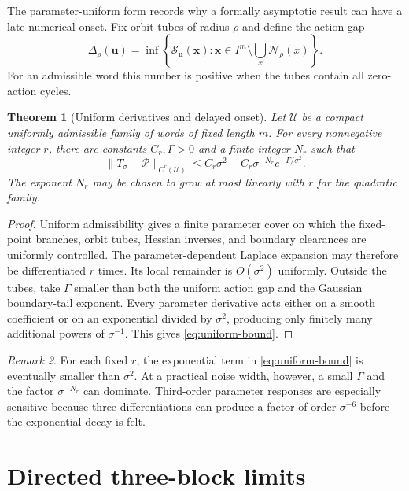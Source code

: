 \documentclass[11pt]{article}
\newtheorem{theorem}{Theorem}[section]
\theoremstyle{remark}
\newtheorem{remark}[theorem]{Remark}
\newcommand{\cP}{\mathcal P}
\newcommand{\cS}{\mathcal S}
\newcommand{\cU}{\mathcal U}
\newcommand{\cN}{\mathcal N}
\newcommand{\bu}{\boldsymbol u}
\newcommand{\bx}{\boldsymbol x}
\begin{document}
The parameter-uniform form records why a formally asymptotic result can have a
late numerical onset.  Fix orbit tubes of radius $\rho$ and define the action
gap
\begin{equation}
 \Delta_\rho(\bu)=
 \inf\left\{\cS_{\bu}(\bx):
 \bx\in I^m\setminus\bigcup_x\cN_\rho(x)\right\}.
 \label{eq:action-gap}
\end{equation}
For an admissible word this number is positive when the tubes contain all
zero-action cycles.

\begin{theorem}[Uniform derivatives and delayed onset]
\label{thm:uniform}
Let $\cU$ be a compact uniformly admissible family of words of fixed length
$m$.  For every nonnegative integer $r$, there are constants
$C_r,\Gamma>0$ and a finite integer $N_r$ such that
\begin{equation}
 \|T_\sigma-\cP\|_{C^r(\cU)}
 \le C_r\sigma^2+C_r\sigma^{-N_r}e^{-\Gamma/\sigma^2}.
 \label{eq:uniform-bound}
\end{equation}
The exponent $N_r$ may be chosen to grow at most linearly with $r$ for the
quadratic family.
\end{theorem}

\begin{proof}
Uniform admissibility gives a finite parameter cover on which the fixed-point
branches, orbit tubes, Hessian inverses, and boundary clearances are uniformly
controlled.  The parameter-dependent Laplace expansion may therefore be
differentiated $r$ times.  Its local remainder is $O(\sigma^2)$ uniformly.
Outside the tubes, take $\Gamma$ smaller than both the uniform action gap and
the Gaussian boundary-tail exponent.  Every parameter derivative acts either
on a smooth coefficient or on an exponential divided by $\sigma^2$, producing
only finitely many additional powers of $\sigma^{-1}$.  This gives
\eqref{eq:uniform-bound}.
\end{proof}

\begin{remark}
For each fixed $r$, the exponential term in \eqref{eq:uniform-bound} is
eventually smaller than $\sigma^2$.  At a practical noise width, however, a
small $\Gamma$ and the factor $\sigma^{-N_r}$ can dominate.  Third-order
parameter responses are especially sensitive because three differentiations
can produce a factor of order $\sigma^{-6}$ before the exponential decay is
felt.
\end{remark}

\section{Directed three-block limits}
\label{sec:directed}
\end{document}
